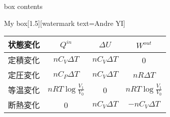 \documentclass[dvipdfmx]{jsarticle}
\begin{document}
\begin{tcolorbox}[enhanced,
  colframe=salmon,
  colback=salmon!20!white,
  coltitle=black,
  drop shadow, title=My box]
box contents
\end{tcolorbox}

\begin{simplesquarebox}[subtitle]{My box}[1.5][watermark text={Andre YI}]
  \lipsum[2]
  \end{simplesquarebox}

  \begin{tabular}{lccc}
    \hline
    状態変化 & $Q^{in}$ & $\varDelta U$ & $W^{out}$ \\
    \hline \hline
    定積変化 & $nC_V\varDelta T$ & $nC_V\varDelta T$ & 0 \\
    定圧変化 & $nC_P\varDelta T$ & $nC_V\varDelta T$ & $nR\varDelta T$ \\
    等温変化 & $nRT\log\frac{V_1}{V_0}$ & 0 & $nRT\log\frac{V_1}{V_0}$ \\
    断熱変化 & 0 & $nC_V\varDelta T$ & $-nC_V\varDelta T$ \\
    \hline
  \end{tabular}
\end{document}
